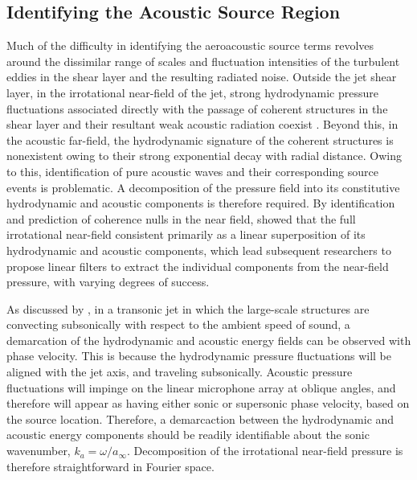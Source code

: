 \subsection{Identifying the Acoustic Source Region}
\label{sect:near_field_source_region}
Much of the difficulty in identifying the aeroacoustic source terms revolves around the dissimilar range of scales and fluctuation intensities of the turbulent eddies in the shear layer and the resulting radiated noise. 
Outside the jet shear layer, in the irrotational near-field of the jet, strong hydrodynamic pressure fluctuations associated directly with the passage of coherent structures in the shear layer and their resultant weak acoustic radiation coexist \citep{Arndt1997}. 
Beyond this, in the acoustic far-field, the hydrodynamic signature of the coherent structures is nonexistent owing to their strong exponential decay with radial distance.
Owing to this, identification of pure acoustic waves and their corresponding source events is problematic.
A decomposition of the pressure field into its constitutive hydrodynamic and acoustic components is therefore required. 
By identification and prediction of coherence nulls in the near field, \citet{Coiffet2006} showed that the full irrotational near-field consistent primarily as a linear superposition of its hydrodynamic and acoustic components, which lead subsequent researchers to propose linear filters to extract the individual components from the near-field pressure, with varying degrees of success. 

As discussed by \citet{Tinney2008}, in a transonic jet in which the large-scale structures are convecting subsonically with respect to the ambient speed of sound, a demarcation of the hydrodynamic and acoustic energy fields can be observed with phase velocity.
This is because the hydrodynamic pressure fluctuations will be aligned with the jet axis, and traveling subsonically. 
Acoustic pressure fluctuations will impinge on the linear microphone array at oblique angles, and therefore will appear as having either sonic or supersonic phase velocity, based on the source location. 
Therefore, a demarcaction between the hydrodynamic and acoustic energy components should be readily identifiable about the sonic wavenumber, $k_a = \omega / a_\infty$.
Decomposition of the irrotational near-field pressure is therefore straightforward in Fourier space.

